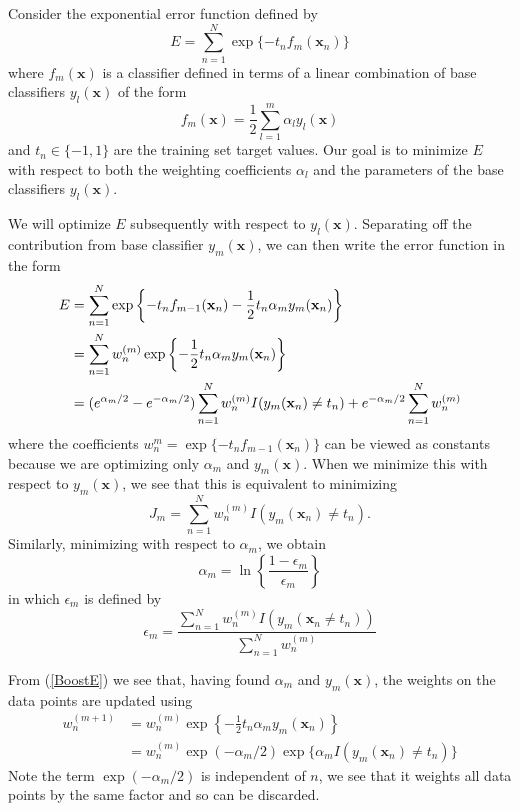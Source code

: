 \documentclass[a4paper]{book}
\renewcommand{\bf}{\mathbf}
\begin{document}
Consider the exponential error function defined by
\begin{equation}
	E = \sum_{n=1}^{N} \exp\{ -t_n f_m(\bf{x}_n) \}
\end{equation}
where $f_m(\bf{x})$ is a classifier defined in terms of a linear combination of base classifiers $y_l(\bf{x})$ of the form
\begin{equation}
	f_m(\bf{x}) = \frac{1}{2} \sum_{l=1}^{m} \alpha_l y_l(\bf{x})
\end{equation}
and $t_n \in \{-1,1 \}$ are the training set target values. Our goal is to minimize $E$ with respect to both the weighting coefficients $\alpha_l$ and the parameters of the base classifiers $y_l(\bf{x})$.

We will optimize $E$ subsequently with respect to $y_l(\bf{x})$. Separating off the contribution from base classifier $y_m(\bf{x})$, we can then write the error function in the form
\begin{align}
	E &= \sum_{n=1}^{N} \exp\left\{ -t_n f_{m-1}(\bf{x}_n) -\frac{1}{2} t_n \alpha_m y_m(\bf{x}_n) \right\} \notag\\
	&= \sum_{n=1}^{N} w_n^{(m)} \exp \left\{ -\frac{1}{2}t_n \alpha_m y_m(\bf{x}_n) \right\} \label{BoostE}	\\
	&= (e^{\alpha_m /2} - e^{-\alpha_m /2}) \sum_{n=1}^{N} w_n^{(m)} I(y_m(\bf{x}_n)\neq t_n)+e^{-\alpha_m /2}\sum_{n=1}^{N}w_n^{(m)}
\end{align}
where the coefficients $w_n^{m} = \exp \{ -t_n f_{m-1}(\bf{x}_n) \}$ can be viewed as constants because we are optimizing only $\alpha_m$ and $y_m(\bf{x})$. When we minimize this with respect to $y_m(\bf{x})$, we see that this is equivalent to minimizing
\begin{equation}
	J_m = \sum_{n=1}^{N} w_n^{(m)} I(y_m(\bf{x}_n)\neq t_n) \label{BoostJ}.
\end{equation}
Similarly, minimizing with respect to $\alpha_m$, we obtain
\begin{equation}
	\alpha_m = \ln \left\{ \frac{1-\epsilon_m}{\epsilon_m} \right\} \label{Boosta}
\end{equation}
in which $\epsilon_m$ is defined by 
\begin{equation}
	\epsilon_m = \frac{\sum_{n=1}^N w_n^{(m)}I(y_m(\bf{x}_n\neq t_n))}{\sum_{n=1}^N w_n^{(m)}} \label{Booste}
\end{equation}

From (\ref{BoostE}) we see that, having found $\alpha_m$ and $y_m(\bf{x})$, the weights on the data points are updated using
\begin{align}
	w_n^{(m+1)} &= w_n^{(m)} \exp \left\{ -\frac{1}{2} t_n \alpha_m y_m(\bf{x}_n) \right\}\\
	&= w_n^{(m)}\exp(-\alpha_m /2)\exp\{ \alpha_m I(y_m(\bf{x}_n)\neq t_n) \}
\end{align}
Note the term $\exp(-\alpha_m /2)$ is independent of $n$, we see that it weights all data points by the same factor and so can be discarded.
\end{document}
